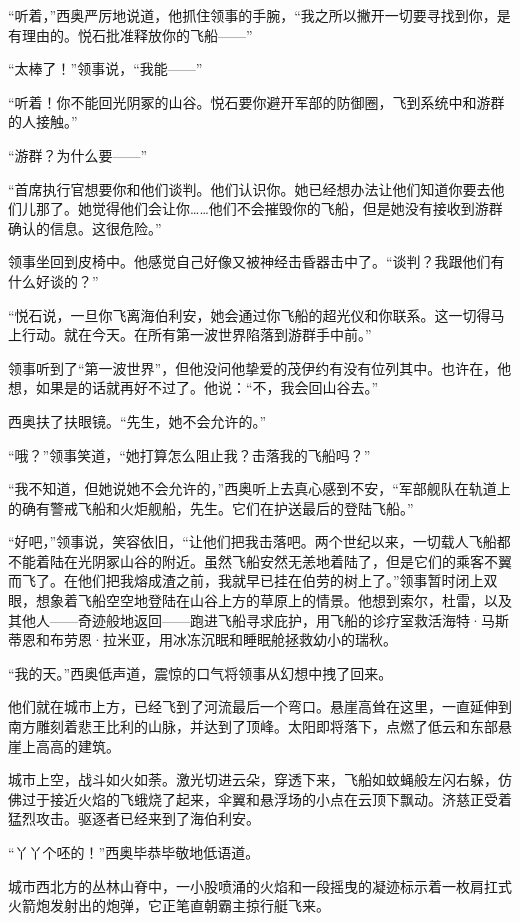 \documentclass[AutoFakeBold=true]{book}
\begin{document}
``听着，''西奥严厉地说道，他抓住领事的手腕，``我之所以撇开一切要寻找到你，是有理由的。悦石批准释放你的飞船——''

``太棒了！''领事说，``我能——''

``听着！你不能回光阴冢的山谷。悦石要你避开军部的防御圈，飞到系统中和游群的人接触。''

``游群？为什么要——''

``首席执行官想要你和他们谈判。他们认识你。她已经想办法让他们知道你要去他们儿那了。她觉得他们会让你……他们不会摧毁你的飞船，但是她没有接收到游群确认的信息。这很危险。''

领事坐回到皮椅中。他感觉自己好像又被神经击昏器击中了。``谈判？我跟他们有什么好谈的？''

``悦石说，一旦你飞离海伯利安，她会通过你飞船的超光仪和你联系。这一切得马上行动。就在今天。在所有第一波世界陷落到游群手中前。''

领事听到了``第一波世界''，但他没问他挚爱的茂伊约有没有位列其中。也许在，他想，如果是的话就再好不过了。他说：``不，我会回山谷去。''

西奥扶了扶眼镜。``先生，她不会允许的。''

``哦？''领事笑道，``她打算怎么阻止我？击落我的飞船吗？''

``我不知道，但她说她不会允许的，''西奥听上去真心感到不安，``军部舰队在轨道上的确有警戒飞船和火炬舰船，先生。它们在护送最后的登陆飞船。''

``好吧，''领事说，笑容依旧，``让他们把我击落吧。两个世纪以来，一切载人飞船都不能着陆在光阴冢山谷的附近。虽然飞船安然无恙地着陆了，但是它们的乘客不翼而飞了。在他们把我熔成渣之前，我就早已挂在伯劳的树上了。''领事暂时闭上双眼，想象着飞船空空地登陆在山谷上方的草原上的情景。他想到索尔，杜雷，以及其他人——奇迹般地返回——跑进飞船寻求庇护，用飞船的诊疗室救活海特·马斯蒂恩和布劳恩·拉米亚，用冰冻沉眠和睡眠舱拯救幼小的瑞秋。

``我的天。''西奥低声道，震惊的口气将领事从幻想中拽了回来。

他们就在城市上方，已经飞到了河流最后一个弯口。悬崖高耸在这里，一直延伸到南方雕刻着悲王比利的山脉，并达到了顶峰。太阳即将落下，点燃了低云和东部悬崖上高高的建筑。

城市上空，战斗如火如荼。激光切进云朵，穿透下来，飞船如蚊蝇般左闪右躲，仿佛过于接近火焰的飞蛾烧了起来，伞翼和悬浮场的小点在云顶下飘动。济慈正受着猛烈攻击。驱逐者已经来到了海伯利安。

``丫丫个呸的！''西奥毕恭毕敬地低语道。

城市西北方的丛林山脊中，一小股喷涌的火焰和一段摇曳的凝迹标示着一枚肩扛式火箭炮发射出的炮弹，它正笔直朝霸主掠行艇飞来。
\end{document}
